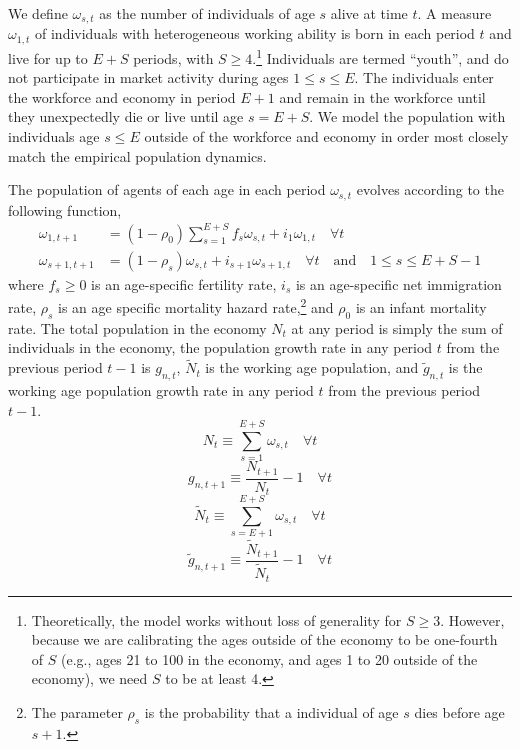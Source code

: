 \documentclass[letterpaper,12pt]{article}
\theoremstyle{definition}
\begin{document}
\begin{spacing}{1.5}
    We define $\omega_{s,t}$ as the number of individuals of age $s$ alive at time $t$. A measure $\omega_{1,t}$ of individuals with heterogeneous working ability is born in each period $t$ and live for up to $E+S$ periods, with $S\geq 4$.\footnote{Theoretically, the model works without loss of generality for $S\geq 3$. However, because we are calibrating the ages outside of the economy to be one-fourth of $S$ (e.g., ages 21 to 100 in the economy, and ages 1 to 20 outside of the economy), we need $S$ to be at least 4.} Individuals are termed ``youth'', and do not participate in market activity during ages $1\leq s\leq E$. The individuals enter the workforce and economy in period $E+1$ and remain in the workforce until they unexpectedly die or live until age $s=E+S$. We model the population with individuals age $s\leq E$ outside of the workforce and economy in order most closely match the empirical population dynamics.

    The population of agents of each age in each period $\omega_{s,t}$ evolves according to the following function,
    \begin{equation}\label{EqPopLawofmotion}
      \begin{split}
        \omega_{1,t+1} &= (1 - \rho_0)\sum_{s=1}^{E+S} f_s\omega_{s,t} + i_1\omega_{1,t}\quad\forall t \\
        \omega_{s+1,t+1} &= (1 - \rho_s)\omega_{s,t} + i_{s+1}\omega_{s+1,t}\quad\forall t\quad\text{and}\quad 1\leq s \leq E+S-1
      \end{split}
    \end{equation}
    where $f_s\geq 0$ is an age-specific fertility rate, $i_s$ is an age-specific net immigration rate, $\rho_s$ is an age specific mortality hazard rate,\footnote{The parameter $\rho_s$ is the probability that a individual of age $s$ dies before age $s+1$.} and $\rho_0$ is an infant mortality rate. The total population in the economy $N_t$ at any period is simply the sum of individuals in the economy, the population growth rate in any period $t$ from the previous period $t-1$ is $g_{n,t}$, $\tilde{N}_t$ is the working age population, and $\tilde{g}_{n,t}$ is the working age population growth rate in any period $t$ from the previous period $t-1$.
    \begin{equation}\label{EqPopN}
      N_t\equiv\sum_{s=1}^{E+S} \omega_{s,t} \quad\forall t
    \end{equation}
    \begin{equation}\label{EqPopGrowth}
      g_{n,t+1} \equiv \frac{N_{t+1}}{N_t} - 1 \quad\forall t
    \end{equation}
    \begin{equation}\label{EqPopNtil}
      \tilde{N}_t\equiv\sum_{s=E+1}^{E+S} \omega_{s,t} \quad\forall t
    \end{equation}
    \begin{equation}\label{EqPopGrowthTil}
      \tilde{g}_{n,t+1} \equiv \frac{\tilde{N}_{t+1}}{\tilde{N}_t} - 1 \quad\forall t
    \end{equation}


\end{spacing}
\end{document}
